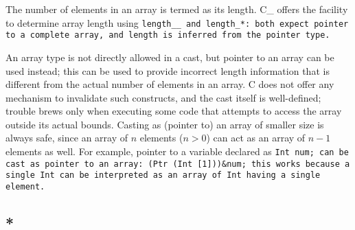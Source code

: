 The number of elements in an array is termed as its length.
C\_ offers the facility to determine array length
using \tt{length__} and \tt{length_}*:
both expect pointer to a complete array, and length is inferred
from the pointer type.

\note An array type is not directly allowed in a cast, but pointer to an
array can be used instead; this can be used to provide incorrect length
information that is different from the actual number of elements in an array.
C does not offer any mechanism to invalidate such constructs, and the
cast itself is well-defined; trouble brews only when executing some
code that attempts to access the array outside its actual bounds.
Casting as (pointer to) an array of smaller size is always safe, since an array
of $n$ elements ($n > 0$) can act as an array of $n - 1$ elements as well.
For example, pointer to a variable declared as \tt{Int num;} can be cast
as pointer to an array: \tt{(Ptr (Int [1]))&num}; this works because a single
\tt{Int} can be interpreted as an array of \tt{Int} having a single element.

\subsection{}


\subsection{*}

